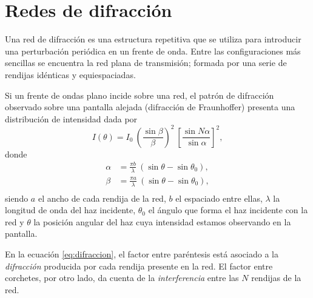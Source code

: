 \documentclass[laboratorio]{guia}
\begin{document}
\maketitle


\section{Redes de difracción}

Una red de difracción es una estructura repetitiva que se utiliza para introducir una perturbación periódica en un frente de onda.
Entre las configuraciones más sencillas se encuentra la red plana de transmisión; formada por una serie de rendijas idénticas y equiespaciadas. 

Si un frente de ondas plano incide sobre una red, el patrón de difracción observado sobre una pantalla alejada (difracción de Fraunhoffer) presenta una distribución de intensidad dada por
\begin{equation}
  I(\theta) = I_0 \: \left( \frac{\sin \beta}{\beta} \right)^2 \: 
  \left[ \frac{\sin N\alpha}{\sin \alpha}\right]^2,
  \label{eq:difraccion}
\end{equation}
donde 
\begin{align*}
  \alpha &= \frac{\pi b}{\lambda} \: 
  \left(\sin \theta - \sin \theta_0 \right), \\
  \beta  &= \frac{\pi a}{\lambda} \: 
  \left(\sin \theta - \sin \theta_0 \right), \\
\end{align*}
siendo \(a\) el ancho de cada rendija de la red, \(b\) el espaciado entre ellas, \(\lambda\) la longitud de onda del haz incidente, \(\theta_0\) el ángulo que forma el haz incidente con la red y \(\theta\) la posición angular del haz cuya intensidad estamos observando en la pantalla.

En la ecuación \eqref{eq:difraccion}, el factor entre paréntesis está asociado a la \emph{difracción} producida por cada rendija presente en la red.
El factor entre corchetes, por otro lado, da cuenta de la \emph{interferencia} entre las \(N\) rendijas de la red. 
\end{document}
